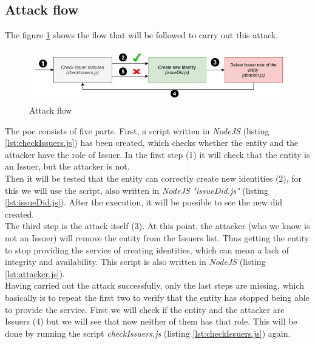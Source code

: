 \subsection{Attack flow}
The figure \ref{fig:poc-flow} shows the flow that will be followed to carry out this attack.
\begin{figure}[h]
    \centering
    \includegraphics[width=1.1\textwidth]{images/PoC/poc-flow.png}
    \caption{Attack flow}
    \label{fig:poc-flow}
\end{figure}

The \acrshort{poc} consists of five parts. First, a script written in \textit{NodeJS} (listing \ref{lst:checkIssuers.js}) has been created, which checks whether the entity and the attacker have the role of Issuer. In the first step (1) it will check that the entity is an Issuer, but the attacker is not.\\


Then it will be tested that the entity can correctly create new identities (2), for this we will use the script, also written in \textit{NodeJS} \textit{"issueDid.js"} (listing \ref{lst:issueDid.js}). After the execution, it will be possible to see the new \acrshort{did} created.\\


The third step is the attack itself (3). At this point, the attacker (who we know is not an Issuer) will remove the entity from the Issuers list. Thus getting the entity to stop providing the service of creating identities, which can mean a lack of integrity and availability. This script is also written in \textit{NodeJS} (listing \ref{lst:attacker.js}).\\


Having carried out the attack successfully, only the last steps are missing, which basically is to repeat the first two to verify that the entity has stopped being able to provide the service. First we will check if the entity and the attacker are Issuers (4) but we will see that now neither of them has that role. This will be done by running the script \textit{checkIssuers.js} (listing \ref{lst:checkIssuers.js}) again. \\

